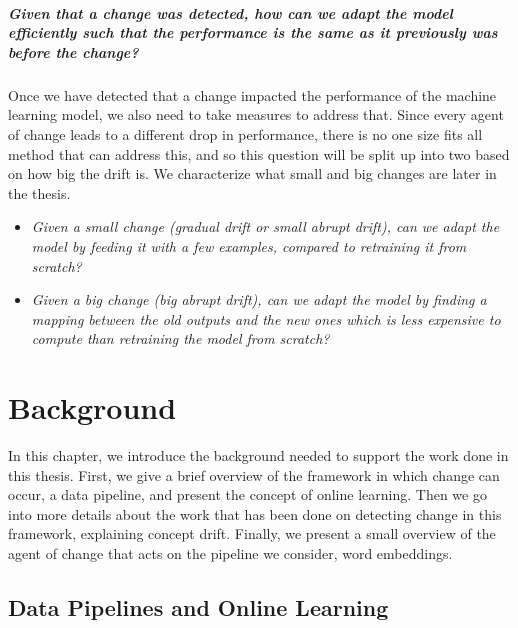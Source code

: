 \documentclass[12pt]{extreport}
\begin{document}
\paragraph*{Given that a change was detected, how can we adapt the model efficiently such that the performance is the same as it previously was before the change?} Once we have detected that a change impacted the performance of the machine learning model, we also need to take measures to address that. Since every agent of change leads to a different drop in performance, there is no one size fits all method that can address this, and so this question will be split up into two based on how big the drift is. We characterize what small and big changes are later in the thesis.
\begin{itemize}
    \item \emph{Given a small change (gradual drift or small abrupt drift), can we adapt the model by feeding it with a few examples, compared to retraining it from scratch?}
    \item \emph{Given a big change (big abrupt drift), can we adapt the model by finding a mapping between the old outputs and the new ones which is less expensive to compute than retraining the model from scratch?}
\end{itemize}

\chapter{Background} \label{sec:background}

In this chapter, we introduce the background needed to support the work done in this thesis. First, we give a brief overview of the framework in which change can occur, a data pipeline, and present the concept of online learning. Then we go into more details about the work that has been done on detecting change in this framework, explaining concept drift. Finally, we present a small overview of the agent of change that acts on the pipeline we consider, word embeddings.

\section{Data Pipelines and Online Learning}
\end{document}
